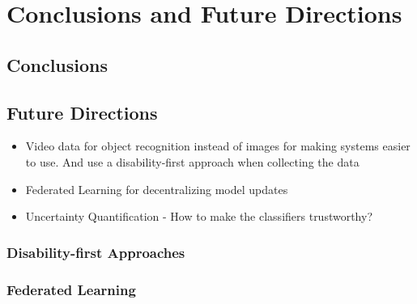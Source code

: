 
\chapter{Conclusions and Future Directions}

\section{Conclusions}


\section{Future Directions}

\begin{itemize}
	\item Video data for object recognition instead of images for making systems easier to use. And use a disability-first approach when collecting the data
	\item Federated Learning for decentralizing model updates 
	\item Uncertainty Quantification - How to make the classifiers trustworthy?
\end{itemize}


\subsection{Disability-first Approaches}


\subsection{Federated Learning}